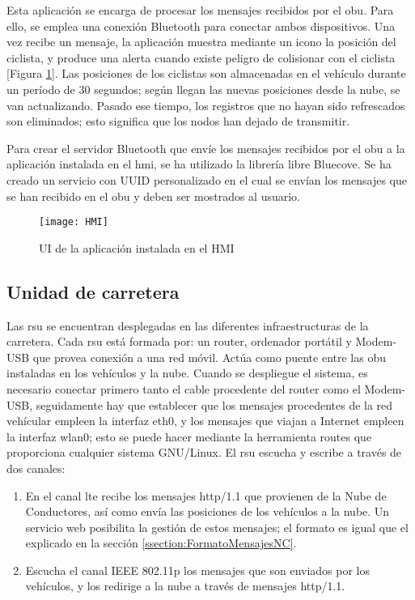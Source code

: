Esta aplicación se encarga de procesar los mensajes recibidos por el \gls{obu}. Para
ello, se emplea una conexión Bluetooth para conectar ambos dispositivos. Una vez
recibe un mensaje, la aplicación muestra mediante un icono la posición del ciclista,
y produce una alerta cuando existe peligro de colisionar con el ciclista [Figura
\ref{figure:HMI}]. Las posiciones de los ciclistas son almacenadas en el vehículo
durante un período de 30 segundos; según llegan las nuevas posiciones desde la nube,
se van actualizando. Pasado ese tiempo, los registros que no hayan sido refrescados son
eliminados; esto significa que los nodos han dejado de transmitir.

Para crear el servidor Bluetooth que envíe los mensajes recibidos por el \gls{obu} a la
aplicación instalada en el \gls{hmi}, se ha utilizado la librería libre Bluecove. Se ha
creado un servicio con UUID personalizado en el cual se envían los mensajes que se han
recibido en el \gls{obu} y deben ser mostrados al usuario.

\begin{figure}[H]
	\begin{center}
		\texttt{[image: HMI]}
		\caption{UI de la aplicación instalada en el HMI}
		\label{figure:HMI}
	\end{center}
\end{figure}

\subsection{Unidad de carretera}
Las \gls{rsu} se encuentran desplegadas en las diferentes infraestructuras de la
carretera. Cada \gls{rsu} está formada por: un router, ordenador portátil y Modem-USB
que provea conexión a una red móvil. Actúa como puente entre las \gls{obu} instaladas
en los vehículos y la nube. Cuando se despliegue el sistema, es necesario conectar
primero tanto el cable procedente del router como el Modem-USB, seguidamente hay que
establecer que los mensajes procedentes de la red vehícular empleen la interfaz eth0,
y los mensajes que viajan a Internet empleen la interfaz wlan0; esto se puede hacer
mediante la herramienta routes que proporciona cualquier sistema GNU/Linux. El \gls{rsu}
escucha y escribe a través de dos canales:
\begin{enumerate}
	\item En el canal \gls{lte} recibe los mensajes \Gls{http/1.1} que provienen de la
	Nube de Conductores, así como envía las posiciones de los vehículos a la nube. Un
	servicio web posibilita la gestión de estos mensajes; el formato es igual que el
	explicado en la sección \ref{ssection:FormatoMensajesNC}.

	\item Escucha el canal IEEE 802.11p los mensajes que son enviados por los vehículos,
	y los redirige a la nube a través de mensajes \Gls{http/1.1}.
\end{enumerate}

